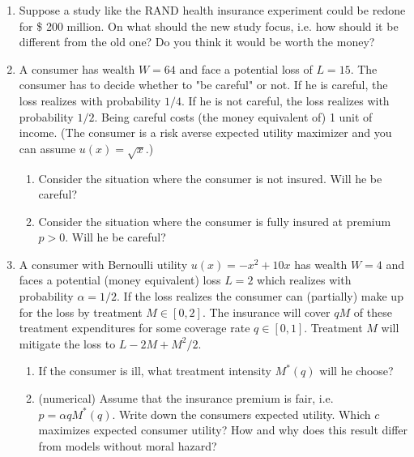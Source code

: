 \documentclass[a4paper]{article}
\begin{document}
\begin{enumerate}[resume]
\item Suppose a study like the RAND health insurance experiment could be redone for \$ 200 million. On what should the new study focus, i.e. how should it be different from the old one? Do you think it would be worth the money?

\item A consumer has wealth \(W=64\) and face a potential loss of \(L=15\). The consumer has to decide whether to "be careful" or not. If he is careful, the loss realizes with probability \(1/4\). If he is not careful, the loss realizes with probability \(1/2\). Being careful costs (the money equivalent of) 1 unit of income. (The consumer is a risk averse expected utility maximizer and you can assume \(u(x)=\sqrt{x}\).)  
\begin{enumerate}
\item Consider the situation where the consumer is not insured. Will he be careful?
\item Consider the situation where the consumer is fully insured at premium \(p>0\). Will he be careful?
\end{enumerate}

\item A consumer with Bernoulli utility \(u(x)=-x^2+10x\) has wealth \(W=4\) and faces a potential (money equivalent) loss \(L=2\) which realizes with probability \(\alpha=1/2\). If the loss realizes the consumer can (partially) make up for the loss by treatment \(M\in[0,2]\). The insurance will cover \(qM\) of these treatment expenditures for some coverage rate \(q\in[0,1]\). Treatment \(M\) will mitigate the loss to \(L-2M+M^2/2\).
\begin{enumerate}
\item If the consumer is ill, what treatment intensity \(M^*(q)\) will he choose?
\item (numerical) Assume that the insurance premium is fair, i.e. \(p=\alpha q M^*(q)\). Write down the consumers expected utility. Which \(c\) maximizes expected consumer utility? How and why does this result differ from models without moral hazard?
\end{enumerate}


\end{enumerate}
\end{document}
